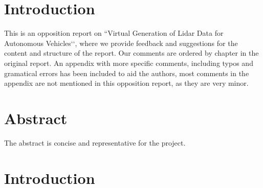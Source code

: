 \documentclass[12pt,a4paper,twoside,openright]{report}
\begin{document}
 


\newcommand{\varHeadline}{Opponering av DATX02-17-10}
\newcommand{\varSubtitle}{Av DATX02-17-12}
\newcommand{\varDepartment}{Department of Computer Science and Engineering}
\newcommand{\varNames}{André Perzon, Björn Strömberg, Chi Thong Luong,  \\
Elias Forsberg, Jesper Åberg, Jon Johnsson}




\section*{Introduction}
	
	This is an opposition report on ``Virtual Generation of Lidar Data for
	Autonomous Vehicles‘‘, where we provide feedback and suggestions for the
	content and structure of the report. Our comments are ordered by chapter in
	the original report. An appendix with more specific comments, including
	typos and gramatical errors has been included to aid the authors, most 
	comments in the appendix are not mentioned in this opposition report, as 
	they are very minor.

\section*{Abstract}

	The abstract is concise and representative for the project.

\section*{Introduction}
\end{document}
